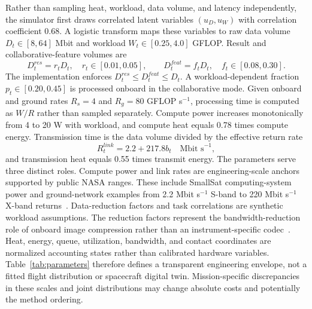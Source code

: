 \documentclass[remotesensing,article,submit,moreauthors]{Definitions/mdpi}
\newenvironment{revisedblock}{\color{red}}{}
\newenvironment{revisedblock}{}{}
\begin{document}
Rather than sampling heat, workload, data volume, and latency independently, the simulator first draws correlated latent variables $(u_D,u_W)$ with correlation coefficient 0.68. A logistic transform maps these variables to raw data volume $D_t\in[8,64]$ Mbit and workload $W_t\in[0.25,4.0]$ GFLOP. Result and collaborative-feature volumes are
\begin{equation}
D_t^{res}=r_tD_t,\quad r_t\in[0.01,0.05],\qquad
D_t^{feat}=f_tD_t,\quad f_t\in[0.08,0.30].
\end{equation}
The implementation enforces $D_t^{res}\le D_t^{feat}\le D_t$. A workload-dependent fraction $p_t\in[0.20,0.45]$ is processed onboard in the collaborative mode. Given onboard and ground rates $R_s=4$ and $R_g=80$ GFLOP s$^{-1}$, processing time is computed as $W/R$ rather than sampled separately. Compute power increases monotonically from 4 to 20 W with workload, and compute heat equals 0.78 times compute energy. Transmission time is the data volume divided by the effective return rate
\begin{equation}
R_t^{link}=2.2+217.8b_t\quad\text{Mbit s}^{-1},
\end{equation}
\begin{revisedblock}
and transmission heat equals 0.55 times transmit energy. The parameters serve three distinct roles. Compute power and link rates are engineering-scale anchors supported by public NASA ranges. These include SmallSat computing-system power and ground-network examples from 2.2 Mbit s$^{-1}$ S-band to 220 Mbit s$^{-1}$ X-band returns~\cite{nasa2026avionics,nasa2026ground}. Data-reduction factors and task correlations are synthetic workload assumptions. The reduction factors represent the bandwidth-reduction role of onboard image compression rather than an instrument-specific codec~\cite{ccsds122}. Heat, energy, queue, utilization, bandwidth, and contact coordinates are normalized accounting states rather than calibrated hardware variables. Table~\ref{tab:parameters} therefore defines a transparent engineering envelope, not a fitted flight distribution or spacecraft digital twin. Mission-specific discrepancies in these scales and joint distributions may change absolute costs and potentially the method ordering.
\end{revisedblock}

\begin{table}[H]
\centering
\caption{Modeled engineering primitives and provenance of the current simulator. Values define a transparent synthetic envelope; they are not presented as a fitted flight distribution.}
\label{tab:parameters}
\resizebox{\textwidth}{!}{}
\end{table}
\end{document}
